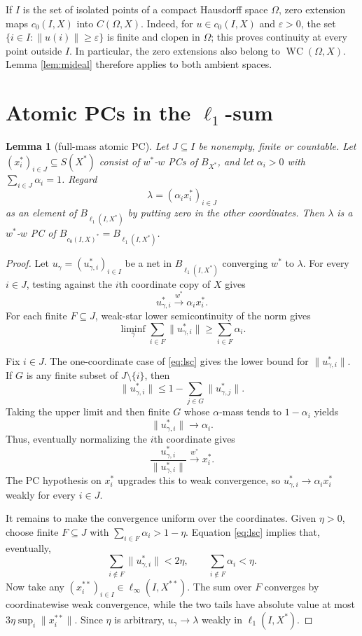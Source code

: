 \documentclass[11pt]{article}
\newtheorem{lemma}[theorem]{Lemma}
\newcommand{\WC}{\operatorname{WC}}
\begin{document}
If $I$ is the set of isolated points of a compact Hausdorff space $\Omega$,
zero extension maps $c_0(I,X)$ into $C(\Omega,X)$.  Indeed, for $u\in c_0(I,X)$
and $\varepsilon>0$, the set
$\{i\in I:\lVert u(i)\rVert\geq\varepsilon\}$ is finite and clopen in
$\Omega$; this proves continuity at every point outside $I$.  In particular,
the zero extensions also belong to $\WC(\Omega,X)$.  Lemma
\ref{lem:mideal} therefore applies to both ambient spaces.

\section*{Atomic PCs in the $\ell_1$-sum}

\begin{lemma}[full-mass atomic PC]\label{lem:l1}
Let $J\subseteq I$ be nonempty, finite or countable.  Let
$(x_i^*)_{i\in J}\subseteq S(X^*)$ consist of $w^*$-$w$ PCs of
$B_{X^*}$, and let $\alpha_i>0$ with $\sum_{i\in J}\alpha_i=1$.  Regard
\[
  \lambda=(\alpha_i x_i^*)_{i\in J}
\]
as an element of $B_{\ell_1(I,X^*)}$ by putting zero in the other coordinates.
Then $\lambda$ is a $w^*$-$w$ PC of
$B_{c_0(I,X)^*}=B_{\ell_1(I,X^*)}$.
\end{lemma}

\begin{proof}
Let $u_\gamma=(u_{\gamma,i}^*)_{i\in I}$ be a net in
$B_{\ell_1(I,X^*)}$ converging $w^*$ to $\lambda$.  For every $i\in J$,
testing against the $i$th coordinate copy of $X$ gives
\[
  u_{\gamma,i}^*\xrightarrow{w^*}\alpha_i x_i^*.
\]
For each finite $F\subseteq J$, weak-star lower semicontinuity of the norm
gives
\begin{equation}\label{eq:lsc}
  \liminf_\gamma\sum_{i\in F}\lVert u_{\gamma,i}^*\rVert
  \geq \sum_{i\in F}\alpha_i.
\end{equation}

Fix $i\in J$.  The one-coordinate case of \eqref{eq:lsc} gives the lower
bound for $\lVert u_{\gamma,i}^*\rVert$.  If $G$ is any finite subset of
$J\setminus\{i\}$, then
\[
  \lVert u_{\gamma,i}^*\rVert
  \leq 1-\sum_{j\in G}\lVert u_{\gamma,j}^*\rVert.
\]
Taking the upper limit and then finite $G$ whose $\alpha$-mass tends to
$1-\alpha_i$ yields
\[
  \lVert u_{\gamma,i}^*\rVert\longrightarrow\alpha_i.
\]
Thus, eventually normalizing the $i$th coordinate gives
\[
  \frac{u_{\gamma,i}^*}{\lVert u_{\gamma,i}^*\rVert}
  \xrightarrow{w^*}x_i^*.
\]
The PC hypothesis on $x_i^*$ upgrades this to weak convergence, so
$u_{\gamma,i}^*\to\alpha_i x_i^*$ weakly for every $i\in J$.

It remains to make the convergence uniform over the coordinates.  Given
$\eta>0$, choose finite $F\subseteq J$ with
$\sum_{i\in F}\alpha_i>1-\eta$.  Equation \eqref{eq:lsc} implies that,
eventually,
\[
  \sum_{i\notin F}\lVert u_{\gamma,i}^*\rVert<2\eta,
  \qquad
  \sum_{i\notin F}\alpha_i<\eta.
\]
Now take any $(x_i^{**})_{i\in I}\in\ell_\infty(I,X^{**})$.  The sum over
$F$ converges by coordinatewise weak convergence, while the two tails have
absolute value at most
$3\eta\sup_i\lVert x_i^{**}\rVert$.  Since $\eta$ is arbitrary,
$u_\gamma\to\lambda$ weakly in $\ell_1(I,X^*)$.
\end{proof}
\end{document}

